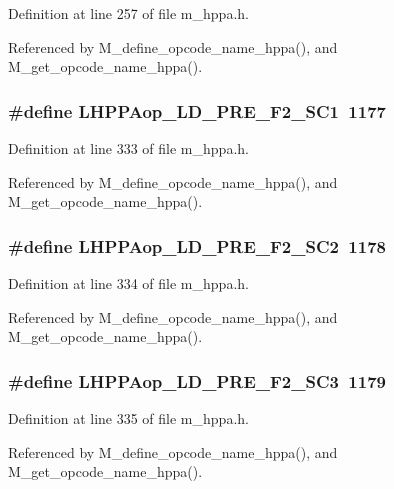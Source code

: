 Definition at line 257 of file m\_\-hppa.h.

Referenced by M\_\-define\_\-opcode\_\-name\_\-hppa(), and M\_\-get\_\-opcode\_\-name\_\-hppa().
\subsubsection{\setlength{\rightskip}{0pt plus 5cm}\#define LHPPAop\_\-LD\_\-PRE\_\-F2\_\-SC1~1177}\label{m__hppa_8h_a758a4730ee2fa609b4aab8f47a99d55}




Definition at line 333 of file m\_\-hppa.h.

Referenced by M\_\-define\_\-opcode\_\-name\_\-hppa(), and M\_\-get\_\-opcode\_\-name\_\-hppa().
\subsubsection{\setlength{\rightskip}{0pt plus 5cm}\#define LHPPAop\_\-LD\_\-PRE\_\-F2\_\-SC2~1178}\label{m__hppa_8h_3cee84fc3eddb5d653727959ebb31c8b}




Definition at line 334 of file m\_\-hppa.h.

Referenced by M\_\-define\_\-opcode\_\-name\_\-hppa(), and M\_\-get\_\-opcode\_\-name\_\-hppa().
\subsubsection{\setlength{\rightskip}{0pt plus 5cm}\#define LHPPAop\_\-LD\_\-PRE\_\-F2\_\-SC3~1179}\label{m__hppa_8h_97bc9afa188feeb6a18066a861f51708}




Definition at line 335 of file m\_\-hppa.h.

Referenced by M\_\-define\_\-opcode\_\-name\_\-hppa(), and M\_\-get\_\-opcode\_\-name\_\-hppa().
